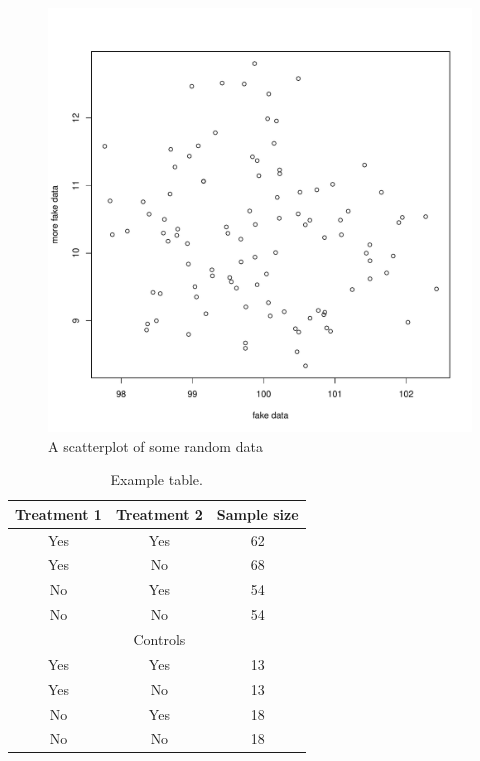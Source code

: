 \documentclass[letterpaper, 12pt]{article}
\begin{document}




\pagebreak
\begin{figure}[H]
    \centering
    \includegraphics[width=0.9\linewidth, natwidth=8in,natheight=8in]{./results/scatterplot.pdf}
  \captionsetup{width=0.75\textwidth}
  \caption{A scatterplot of some random data}
    	\label{fig:scatterplot} %
\end{figure}

\pagebreak
\begin{table}[H]
    \centering
	\caption{Example table.}
	\label{table:simpleExample}
	\begin{tabular}{ccc} %
    \hline
	Treatment 1 & Treatment 2 & Sample size \\
    \hline
	 Yes & Yes & 62\\
	 Yes & No & 68\\
	 No & Yes & 54\\
	 No & No & 54\\
	 \hline
    & Controls & \\
    \hline
     Yes & Yes & 13\\
	 Yes & No & 13\\
	 No & Yes & 18\\
	 No & No & 18\\
	\hline
	\end{tabular}
\end{table}
\end{document}

